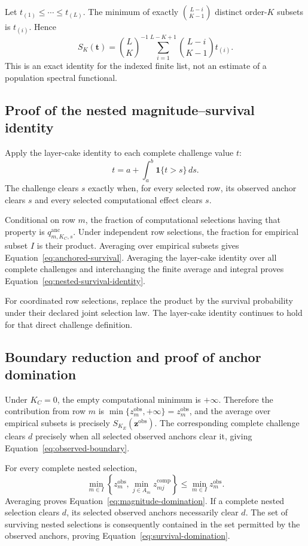 \documentclass[11pt]{article}
\theoremstyle{remark}
\begin{document}
Let $t_{(1)}\leq\cdots\leq t_{(L)}$. The minimum of exactly
$\binom{L-i}{K-1}$ distinct order-$K$ subsets is $t_{(i)}$. Hence
\begin{equation}
S_K(\mathbf t)
=
\binom{L}{K}^{-1}
\sum_{i=1}^{L-K+1}
\binom{L-i}{K-1}t_{(i)}.
\label{eq:finite-ordered}
\end{equation}
This is an exact identity for the indexed finite list, not an estimate of a
population spectral functional.

\subsection{Proof of the nested magnitude--survival identity}
\label{app:proof-survival-identity}

Apply the layer-cake identity to each complete challenge value $t$:
\[
t
=
a+\int_a^b\mathbf 1\{t>s\}\,ds.
\]
The challenge clears $s$ exactly when, for every selected row, its observed
anchor clears $s$ and every selected computational effect clears $s$.

Conditional on row $m$, the fraction of computational selections having that
property is $q^{\mathrm{anc}}_{m,K_C,s}$. Under independent row selections, the
fraction for empirical subset $I$ is their product. Averaging over empirical
subsets gives Equation~\eqref{eq:anchored-survival}. Averaging the layer-cake
identity over all complete challenges and interchanging the finite average and
integral proves Equation~\eqref{eq:nested-survival-identity}.

For coordinated row selections, replace the product by the survival
probability under their declared joint selection law. The layer-cake identity
continues to hold for that direct challenge definition.

\subsection{Boundary reduction and proof of anchor domination}
\label{app:proof-anchor-domination}

Under $K_C=0$, the empty computational minimum is $+\infty$. Therefore
the contribution from row $m$ is
$\min\{z_m^{\mathrm{obs}},+\infty\}=z_m^{\mathrm{obs}}$, and the average over
empirical subsets is precisely $S_{K_E}(\mathbf z^{\mathrm{obs}})$. The
corresponding complete challenge clears $d$ precisely when all selected
observed anchors clear it, giving Equation~\eqref{eq:observed-boundary}.

For every complete nested selection,
\[
\min_{m\in I}
\left\{z_m^{\mathrm{obs}},
\min_{j\in A_m}z_{mj}^{\mathrm{comp}}\right\}
\leq
\min_{m\in I}z_m^{\mathrm{obs}}.
\]
Averaging proves Equation~\eqref{eq:magnitude-domination}. If a complete
nested selection clears $d$, its selected observed anchors necessarily clear
$d$. The set of surviving nested selections is consequently contained in the
set permitted by the observed anchors, proving
Equation~\eqref{eq:survival-domination}.
\end{document}

